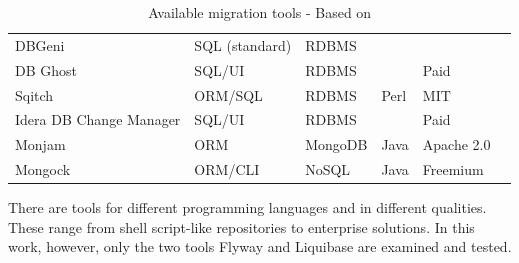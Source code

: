 \pagebreak
\begin{table}[H]
	\centering
	\begin{tabularx}{14cm}{p{3cm} p{3cm} p{2cm} l l p{2cm} }
				DBGeni & SQL (standard) & RDBMS & & \\
				DB Ghost & SQL/UI & RDBMS & & Paid\\
				Sqitch & ORM/SQL & RDBMS & Perl & MIT \\
				Idera DB Change Manager & SQL/UI & RDBMS & & Paid\\
				Monjam & ORM & MongoDB & Java & Apache 2.0\\
				Mongock & ORM/CLI & NoSQL & Java & Freemium\\
		\bottomrule
	\end{tabularx}
	\caption{Available migration tools - Based on \cite{GoogleCloudTools, DBMSTools}}
	\label{tab:migration_tools}
\end{table}

There are tools for different programming languages and in different qualities. These range from shell script-like repositories to enterprise solutions. In this work, however, only the two tools Flyway and Liquibase are examined and tested.






